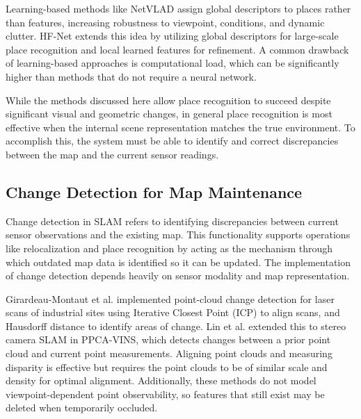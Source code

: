 Learning-based methods like NetVLAD \cite{arandjelovicNetVLADCNNArchitecture2016} assign global descriptors to places rather than features, increasing robustness to viewpoint, conditions, and dynamic clutter. HF-Net \cite{sarlinCoarseFineRobust2019} extends this idea by utilizing global descriptors for large-scale place recognition and local learned features for refinement. A common drawback of learning-based approaches is computational load, which can be significantly higher than methods that do not require a neural network.

While the methods discussed here allow place recognition to succeed despite significant visual and geometric changes, in general place recognition is most effective when the internal scene representation matches the true environment. To accomplish this, the system must be able to identify and correct discrepancies between the map and the current sensor readings.

\subsection{Change Detection for Map Maintenance}

Change detection in SLAM refers to identifying discrepancies between current sensor observations and the existing map. This functionality supports operations like relocalization and place recognition by acting as the mechanism through which outdated map data is identified so it can be updated. The implementation of change detection depends heavily on sensor modality and map representation.

Girardeau-Montaut et al. \cite{girardeau-montautCHANGEDETECTIONPOINTS2005} implemented point-cloud change detection for laser scans of industrial sites using Iterative Closest Point (ICP) \cite{arunLeastSquaresFittingTwo1987,beslMethodRegistration3D1992} to align scans, and Hausdorff distance \cite{aspertMESHMeasuringErrors2002} to identify areas of change. Lin et al. \cite{linPointCloudChange2022} extended this to stereo camera SLAM in PPCA-VINS, which detects changes between a prior point cloud and current point measurements. Aligning point clouds and measuring disparity is effective but requires the point clouds to be of similar scale and density for optimal alignment. Additionally, these methods do not model viewpoint-dependent point observability, so features that still exist may be deleted when temporarily occluded.


